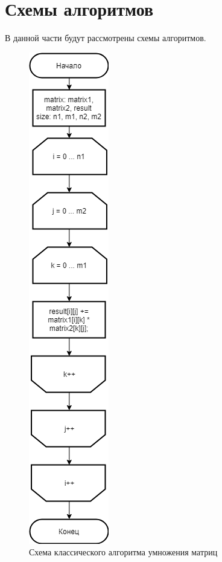 \documentclass[12pt]{report}
\begin{document}
\section{Схемы алгоритмов}
В данной части будут рассмотрены схемы алгоритмов.

\begin{figure}[!htbp]
\centering
\includegraphics[scale=0.7]{SchemeStand}
\caption{Схема классического алгоритма умножения матриц}
\label{fig:mpr}
\end{figure}
\end{document}
